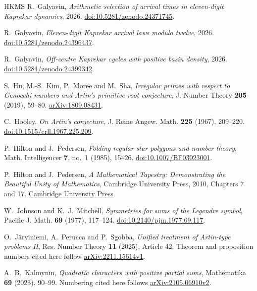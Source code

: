 \documentclass[11pt,reqno]{amsart}
\begin{document}
\begin{thebibliography}{HKMS}
R.~Galyavin, \emph{Arithmetic selection of arrival times in eleven-digit Kaprekar dynamics}, 2026.
\href{https://doi.org/10.5281/zenodo.24371745}{doi:10.5281/zenodo.24371745}.

R.~Galyavin, \emph{Eleven-digit Kaprekar arrival laws modulo twelve}, 2026.
\href{https://doi.org/10.5281/zenodo.24396437}{doi:10.5281/zenodo.24396437}.

R.~Galyavin, \emph{Off-centre Kaprekar cycles with positive basin density}, 2026.
\href{https://doi.org/10.5281/zenodo.24399342}{doi:10.5281/zenodo.24399342}.

S.~Hu, M.-S.~Kim, P.~Moree and M.~Sha, \emph{Irregular primes with respect to Genocchi numbers and Artin's primitive root conjecture},
J. Number Theory \textbf{205} (2019), 59--80.
\href{https://arxiv.org/abs/1809.08431}{arXiv:1809.08431}.

C.~Hooley, \emph{On Artin's conjecture}, J. Reine Angew. Math. \textbf{225} (1967), 209--220.
\href{https://doi.org/10.1515/crll.1967.225.209}{doi:10.1515/crll.1967.225.209}.

P.~Hilton and J.~Pedersen, \emph{Folding regular star polygons and number theory},
Math. Intelligencer \textbf{7}, no.~1 (1985), 15--26.
\href{https://doi.org/10.1007/BF03023001}{doi:10.1007/BF03023001}.

P.~Hilton and J.~Pedersen, \emph{A Mathematical Tapestry: Demonstrating the Beautiful Unity of Mathematics},
Cambridge University Press, 2010, Chapters 7 and 17.
\href{https://doi.org/10.1017/CBO9780511777004}{Cambridge University Press}.

W.~Johnson and K.~J.~Mitchell, \emph{Symmetries for sums of the Legendre symbol},
Pacific J. Math. \textbf{69} (1977), 117--124.
\href{https://doi.org/10.2140/pjm.1977.69.117}{doi:10.2140/pjm.1977.69.117}.

O.~J\"arviniemi, A.~Perucca and P.~Sgobba, \emph{Unified treatment of Artin-type problems II},
Res. Number Theory \textbf{11} (2025), Article 42.
Theorem and proposition numbers cited here follow \href{https://arxiv.org/abs/2211.15614v1}{arXiv:2211.15614v1}.

A.~B.~Kalmynin, \emph{Quadratic characters with positive partial sums},
Mathematika \textbf{69} (2023), 90--99.
Numbering cited here follows \href{https://arxiv.org/abs/2105.06910v2}{arXiv:2105.06910v2}.


\end{thebibliography}
\end{document}
